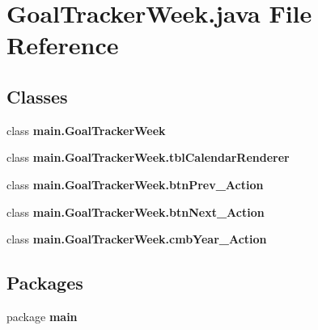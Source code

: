 \section{Goal\+Tracker\+Week.\+java File Reference}
\label{_goal_tracker_week_8java}
\subsection*{Classes}
\begin{DoxyCompactItemize}
\item 
class \textbf{ main.\+Goal\+Tracker\+Week}
\item 
class {\bfseries main.\+Goal\+Tracker\+Week.\+tbl\+Calendar\+Renderer}
\item 
class {\bfseries main.\+Goal\+Tracker\+Week.\+btn\+Prev\+\_\+\+Action}
\item 
class {\bfseries main.\+Goal\+Tracker\+Week.\+btn\+Next\+\_\+\+Action}
\item 
class {\bfseries main.\+Goal\+Tracker\+Week.\+cmb\+Year\+\_\+\+Action}
\end{DoxyCompactItemize}
\subsection*{Packages}
\begin{DoxyCompactItemize}
\item 
package \textbf{ main}
\end{DoxyCompactItemize}
